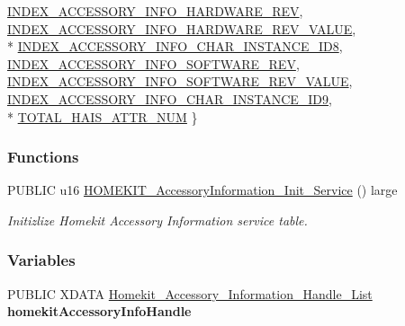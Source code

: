 \begin{DoxyCompactItemize}
\hyperlink{group___h_a_i_s_ggaccb52c060db272fbfde92ca8e657cc4ba72b4c0465eb6bf22e095144752d2821c}{I\+N\+D\+E\+X\+\_\+\+A\+C\+C\+E\+S\+S\+O\+R\+Y\+\_\+\+I\+N\+F\+O\+\_\+\+H\+A\+R\+D\+W\+A\+R\+E\+\_\+\+R\+EV}, 
\hyperlink{group___h_a_i_s_ggaccb52c060db272fbfde92ca8e657cc4bac80e3f1931a9218cd8fd860195529812}{I\+N\+D\+E\+X\+\_\+\+A\+C\+C\+E\+S\+S\+O\+R\+Y\+\_\+\+I\+N\+F\+O\+\_\+\+H\+A\+R\+D\+W\+A\+R\+E\+\_\+\+R\+E\+V\+\_\+\+V\+A\+L\+UE}, 
\\*
\hyperlink{group___h_a_i_s_ggaccb52c060db272fbfde92ca8e657cc4bacb29f1f5413783732595dcc9162294c8}{I\+N\+D\+E\+X\+\_\+\+A\+C\+C\+E\+S\+S\+O\+R\+Y\+\_\+\+I\+N\+F\+O\+\_\+\+C\+H\+A\+R\+\_\+\+I\+N\+S\+T\+A\+N\+C\+E\+\_\+\+I\+D8}, 
\hyperlink{group___h_a_i_s_ggaccb52c060db272fbfde92ca8e657cc4ba53fb64e240b623730b410b48f7061181}{I\+N\+D\+E\+X\+\_\+\+A\+C\+C\+E\+S\+S\+O\+R\+Y\+\_\+\+I\+N\+F\+O\+\_\+\+S\+O\+F\+T\+W\+A\+R\+E\+\_\+\+R\+EV}, 
\hyperlink{group___h_a_i_s_ggaccb52c060db272fbfde92ca8e657cc4bace101a87024e39d8a7512127d8a350eb}{I\+N\+D\+E\+X\+\_\+\+A\+C\+C\+E\+S\+S\+O\+R\+Y\+\_\+\+I\+N\+F\+O\+\_\+\+S\+O\+F\+T\+W\+A\+R\+E\+\_\+\+R\+E\+V\+\_\+\+V\+A\+L\+UE}, 
\hyperlink{group___h_a_i_s_ggaccb52c060db272fbfde92ca8e657cc4ba1bc9047e83e6aeaeb23d2e8e3ef1978d}{I\+N\+D\+E\+X\+\_\+\+A\+C\+C\+E\+S\+S\+O\+R\+Y\+\_\+\+I\+N\+F\+O\+\_\+\+C\+H\+A\+R\+\_\+\+I\+N\+S\+T\+A\+N\+C\+E\+\_\+\+I\+D9}, 
\\*
\hyperlink{group___h_a_i_s_ggaccb52c060db272fbfde92ca8e657cc4baddc4a28191266c6e01f29f9d2220d0a8}{T\+O\+T\+A\+L\+\_\+\+H\+A\+I\+S\+\_\+\+A\+T\+T\+R\+\_\+\+N\+UM}
 \}
\end{DoxyCompactItemize}
\subsubsection*{Functions}
\begin{DoxyCompactItemize}
\item 
P\+U\+B\+L\+IC u16 \hyperlink{group___h_a_i_s_gaa6d2968012d169c7a3fa99fe3eec76e2}{H\+O\+M\+E\+K\+I\+T\+\_\+\+Accessory\+Information\+\_\+\+Init\+\_\+\+Service} () large
\begin{DoxyCompactList}\small\item\em Initizlize Homekit Accessory Information service table. \end{DoxyCompactList}\end{DoxyCompactItemize}
\subsubsection*{Variables}
\begin{DoxyCompactItemize}
\item 
P\+U\+B\+L\+IC X\+D\+A\+TA \hyperlink{struct_homekit___accessory___information___handle___list}{Homekit\+\_\+\+Accessory\+\_\+\+Information\+\_\+\+Handle\+\_\+\+List} {\bfseries homekit\+Accessory\+Info\+Handle}\hypertarget{group___h_a_i_s_gaab461d377eab3a9abfa0dff9f38e8a38}{}\label{group___h_a_i_s_gaab461d377eab3a9abfa0dff9f38e8a38}

\end{DoxyCompactItemize}



